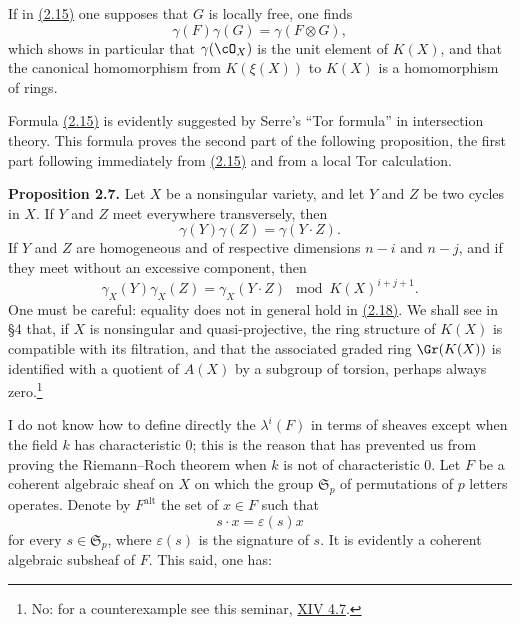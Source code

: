 If in \hyperlink{sga6.e00.eq.2-15}{(2.15)} one supposes that $G$ is locally free, one finds
\begin{equation}\tag{2.15 bis}
 \gamma(F)\gamma(G)=\gamma(F\otimes G),
\end{equation}
which shows in particular that $\gamma(\cO_X)$ is the unit element of $K(X)$, and that the canonical homomorphism from $K(\xi(X))$ to $K(X)$ is a homomorphism of rings.

Formula \hyperlink{sga6.e00.eq.2-15}{(2.15)} is evidently suggested by Serre's ``Tor formula'' in intersection theory. This formula proves the second part of the following proposition, the first part following immediately from \hyperlink{sga6.e00.eq.2-15}{(2.15)} and from a local Tor calculation.

\textbf{Proposition 2.7.} Let $X$ be a nonsingular variety, and let $Y$ and $Z$ be two cycles in $X$. If $Y$ and $Z$ meet everywhere transversely, then
\begin{equation}\tag{2.17}
 \gamma(Y)\gamma(Z)=\gamma(Y\cdot Z).
\end{equation}
If $Y$ and $Z$ are homogeneous and of respective dimensions $n-i$ and $n-j$, and if they meet without an excessive component, then
\begin{equation}\tag{2.18}
 \gamma_X(Y)\gamma_X(Z)=\gamma_X(Y\cdot Z)\mod K(X)^{i+j+1}.
\end{equation}
One must be careful: equality does not in general hold in \hyperlink{sga6.e00.eq.2-18}{(2.18)}. We shall see in \S 4 that, if $X$ is nonsingular and quasi-projective, the ring structure of $K(X)$ is compatible with its filtration, and that the associated graded ring $\Gr(K(X))$ is identified with a quotient of $A(X)$ by a subgroup of torsion, perhaps always zero.\footnote{No: for a counterexample see this seminar, \hyperlink{sga6.e14.para.4-7}{XIV 4.7}.}

I do not know how to define directly the $\lambda^i(F)$ in terms of sheaves except when the field $k$ has characteristic $0$; this is the reason that has prevented us from proving the Riemann--Roch theorem when $k$ is not of characteristic $0$. Let $F$ be a coherent algebraic sheaf on $X$ on which the group $\mathfrak S_p$ of permutations of $p$ letters operates. Denote by $F^{\mathrm{alt}}$ the set of $x\in F$ such that
\[
 s\cdot x=\varepsilon(s)x
\]
for every $s\in\mathfrak S_p$, where $\varepsilon(s)$ is the signature of $s$. It is evidently a coherent algebraic subsheaf of $F$. This said, one has:

